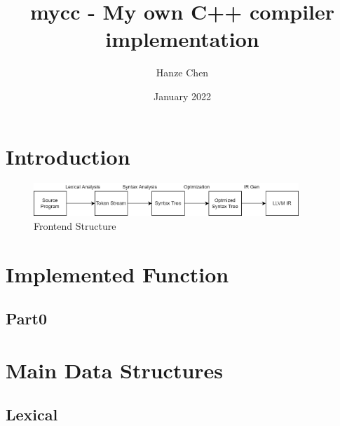\documentclass{article}
\title{mycc - My own C++ compiler implementation}
\author{Hanze Chen}
\date{January 2022}
\begin{document}
\maketitle
\section{Introduction}
    \begin{figure}[hb!]
        \centering
        \includegraphics[width=10cm]{figure/frontend_structure.png}
        \caption{Frontend Structure}
        \label{Fig:frontend_structure}
    \end{figure}
\section{Implemented Function}
\subsection{Part0}

\section{Main Data Structures}
    \subsection{Lexical}
\end{document}
